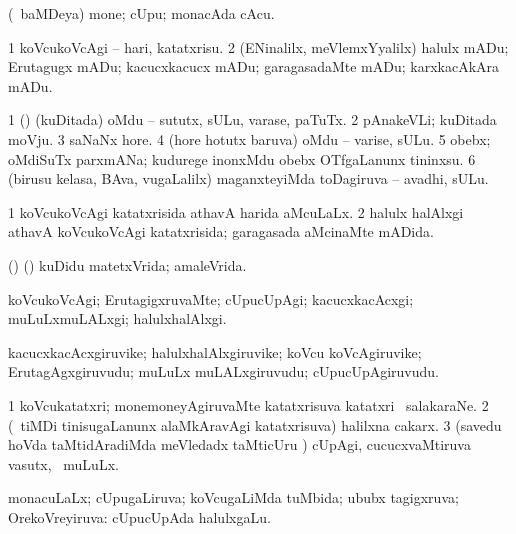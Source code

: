 \bentry
{}
\gl{\nA}
\bmng
(\kanmu\ baMDeya) mone; cUpu; monacAda cAcu. 
\emng
\eentry

\bentry
{}
\gl{\sakirx}
\bmng
\bnum
\num{1} koVcukoVcAgi -- hari, katatxrisu. 
\num{2} (ENinalilx, meVlemxYyalilx) halulx mADu; Erutagugx mADu; kacucxkacucx mADu; garagasadaMte mADu; karxkacAkAra mADu. 
\enum
\emng
\eentry

\bentry
{}
\gl{\nA}
\bmng
\bnum
\num{1} (\ashi) (kuDitada) oMdu -- sututx, sULu, varase, paTuTx. 
\num{2} pAnakeVLi; kuDitada moVju. 
\num{3} saNaNx hore. 
\num{4} (hore hotutx baruva) oMdu -- varise, sULu. 
\num{5} obebx; oMdiSuTx parxmANa;  kudurege inonxMdu obebx OTfgaLanunx tininxsu. 
\num{6} (birusu kelasa, BAva, \mo vugaLalilx) maganxteyiMda toDagiruva -- avadhi, sULu. 
\enum
\emng
\eentry

\bentry
{}
\gl{\gu}
\bmng
\bnum
\num{1} koVcukoVcAgi katatxrisida athavA harida aMcuLaLx. 
\num{2} halulx halAlxgi athavA koVcukoVcAgi katatxrisida; garagasada aMcinaMte mADida. 
\enum
\emng
\eentry

\bentry
{}
\gl{\gu}
\bmng
(\ame) (\ashi) kuDidu matetxVrida; amaleVrida. 
\emng
\eentry

\bentry
{}
\gl{\kirxvi}
\bmng
koVcukoVcAgi; ErutagigxruvaMte; cUpucUpAgi; kacucxkacAcxgi; muLuLxmuLALxgi; halulxhalAlxgi. 
\emng
\eentry

\bentry
{}
\gl{\nA}
\bmng
kacucxkacAcxgiruvike; halulxhalAlxgiruvike; koVcu koVcAgiruvike; ErutagAgxgiruvudu; muLuLx muLALxgiruvudu; cUpucUpAgiruvudu. 
\emng
\eentry

\bentry
{}
\gl{\nA}
\bmng
\bnum
\num{1} koVcukatatxri; monemoneyAgiruvaMte katatxrisuva katatxri \mo\ salakaraNe. 
\num{2} (\kanmu\ tiMDi tinisugaLanunx alaMkAravAgi katatxrisuva) halilxna cakarx. 
\num{3} (savedu hoVda taMtidAradiMda meVledadx taMticUru \mo) cUpAgi, cucucxvaMtiruva vasutx, \kanmu\ muLuLx. 
\enum
\emng
\eentry

\bentry
{}
\gl{\gu}
\bmng
monacuLaLx; cUpugaLiruva; koVcugaLiMda tuMbida; ububx tagigxruva; OrekoVreyiruva:  cUpucUpAda halulxgaLu. 
\emng
\eentry

